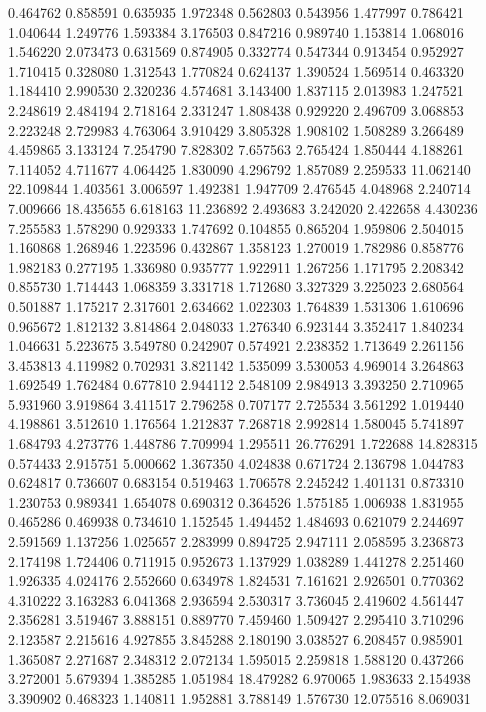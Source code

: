 0.464762
0.858591
0.635935
1.972348
0.562803
0.543956
1.477997
0.786421
1.040644
1.249776
1.593384
3.176503
0.847216
0.989740
1.153814
1.068016
1.546220
2.073473
0.631569
0.874905
0.332774
0.547344
0.913454
0.952927
1.710415
0.328080
1.312543
1.770824
0.624137
1.390524
1.569514
0.463320
1.184410
2.990530
2.320236
4.574681
3.143400
1.837115
2.013983
1.247521
2.248619
2.484194
2.718164
2.331247
1.808438
0.929220
2.496709
3.068853
2.223248
2.729983
4.763064
3.910429
3.805328
1.908102
1.508289
3.266489
4.459865
3.133124
7.254790
7.828302
7.657563
2.765424
1.850444
4.188261
7.114052
4.711677
4.064425
1.830090
4.296792
1.857089
2.259533
11.062140
22.109844
1.403561
3.006597
1.492381
1.947709
2.476545
4.048968
2.240714
7.009666
18.435655
6.618163
11.236892
2.493683
3.242020
2.422658
4.430236
7.255583
1.578290
0.929333
1.747692
0.104855
0.865204
1.959806
2.504015
1.160868
1.268946
1.223596
0.432867
1.358123
1.270019
1.782986
0.858776
1.982183
0.277195
1.336980
0.935777
1.922911
1.267256
1.171795
2.208342
0.855730
1.714443
1.068359
3.331718
1.712680
3.327329
3.225023
2.680564
0.501887
1.175217
2.317601
2.634662
1.022303
1.764839
1.531306
1.610696
0.965672
1.812132
3.814864
2.048033
1.276340
6.923144
3.352417
1.840234
1.046631
5.223675
3.549780
0.242907
0.574921
2.238352
1.713649
2.261156
3.453813
4.119982
0.702931
3.821142
1.535099
3.530053
4.969014
3.264863
1.692549
1.762484
0.677810
2.944112
2.548109
2.984913
3.393250
2.710965
5.931960
3.919864
3.411517
2.796258
0.707177
2.725534
3.561292
1.019440
4.198861
3.512610
1.176564
1.212837
7.268718
2.992814
1.580045
5.741897
1.684793
4.273776
1.448786
7.709994
1.295511
26.776291
1.722688
14.828315
0.574433
2.915751
5.000662
1.367350
4.024838
0.671724
2.136798
1.044783
0.624817
0.736607
0.683154
0.519463
1.706578
2.245242
1.401131
0.873310
1.230753
0.989341
1.654078
0.690312
0.364526
1.575185
1.006938
1.831955
0.465286
0.469938
0.734610
1.152545
1.494452
1.484693
0.621079
2.244697
2.591569
1.137256
1.025657
2.283999
0.894725
2.947111
2.058595
3.236873
2.174198
1.724406
0.711915
0.952673
1.137929
1.038289
1.441278
2.251460
1.926335
4.024176
2.552660
0.634978
1.824531
7.161621
2.926501
0.770362
4.310222
3.163283
6.041368
2.936594
2.530317
3.736045
2.419602
4.561447
2.356281
3.519467
3.888151
0.889770
7.459460
1.509427
2.295410
3.710296
2.123587
2.215616
4.927855
3.845288
2.180190
3.038527
6.208457
0.985901
1.365087
2.271687
2.348312
2.072134
1.595015
2.259818
1.588120
0.437266
3.272001
5.679394
1.385285
1.051984
18.479282
6.970065
1.983633
2.154938
3.390902
0.468323
1.140811
1.952881
3.788149
1.576730
12.075516
8.069031
